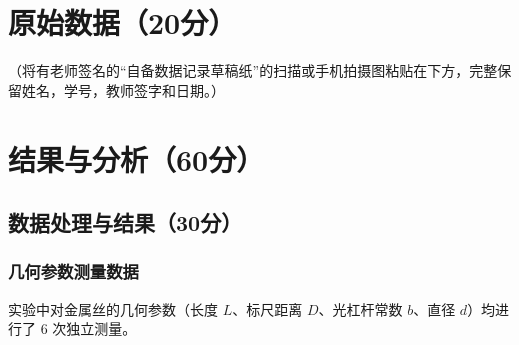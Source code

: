 \documentclass{../../templates/Report}%
\begin{document}
\begin{fullreportonly}
    \section{原始数据（20分）}
    （将有老师签名的“自备数据记录草稿纸”的扫描或手机拍摄图粘贴在下方，完整保留姓名，学号，教师签字和日期。）

    \section{结果与分析（60分）}

    \subsection{数据处理与结果（30分）}

    \subsubsection{几何参数测量数据}
    实验中对金属丝的几何参数（长度 $L$、标尺距离 $D$、光杠杆常数 $b$、直径 $d$）均进行了 6 次独立测量。


\end{fullreportonly}
\end{document}
